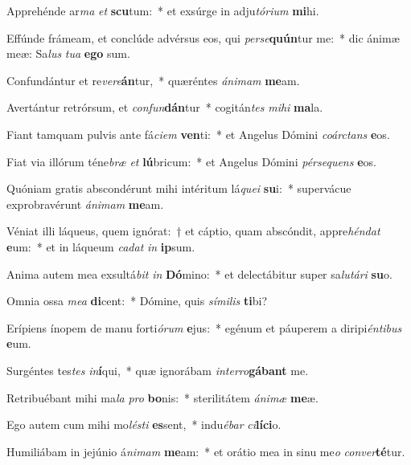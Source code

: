 \item Apprehénde ar\textit{ma} \textit{et} \textbf{scu}tum:~* et exsúrge in adju\textit{tó}\textit{ri}\textit{um} \textbf{mi}hi.
\item Effúnde frámeam, et conclúde advérsus eos, qui \textit{per}\textit{se}\textbf{quún}tur me:~* dic ánimæ meæ: Sa\textit{lus} \textit{tu}\textit{a} \textbf{e}\textbf{go} sum.
\item Confundántur et re\textit{ve}\textit{re}\textbf{án}tur,~* quæréntes \textit{á}\textit{ni}\textit{mam} \textbf{me}am.
\item Avertántur retrórsum, et \textit{con}\textit{fun}\textbf{dán}tur~* cogitán\textit{tes} \textit{mi}\textit{hi} \textbf{ma}la.
\item Fiant tamquam pulvis ante fá\textit{ci}\textit{em} \textbf{ven}ti:~* et Angelus Dómini \textit{co}\textit{árc}\textit{tans} \textbf{e}os.
\item Fiat via illórum téne\textit{bræ} \textit{et} \textbf{lú}bricum:~* et Angelus Dómini \textit{pér}\textit{se}\textit{quens} \textbf{e}os.
\item Quóniam gratis abscondérunt mihi intéritum lá\textit{que}\textit{i} \textbf{su}i:~* supervácue exprobravérunt \textit{á}\textit{ni}\textit{mam} \textbf{me}am.
\item Véniat illi láqueus, quem ignórat:~† et cáptio, quam abscóndit, appre\textit{hén}\textit{dat} \textbf{e}um:~* et in láqueum \textit{ca}\textit{dat} \textit{in} \textbf{ip}sum.
\item Anima autem mea exsultá\textit{bit} \textit{in} \textbf{Dó}mino:~* et delectábitur super sa\textit{lu}\textit{tá}\textit{ri} \textbf{su}o.
\item Omnia ossa \textit{me}\textit{a} \textbf{di}cent:~* Dómine, quis \textit{sí}\textit{mi}\textit{lis} \textbf{ti}bi?
\item Erípiens ínopem de manu forti\textit{ó}\textit{rum} \textbf{e}jus:~* egénum et páuperem a diripi\textit{én}\textit{ti}\textit{bus} \textbf{e}um.
\item Surgéntes tes\textit{tes} \textit{in}\textbf{í}qui,~* quæ ignorábam \textit{in}\textit{ter}\textit{ro}\textbf{gá}\textbf{bant} me.
\item Retribuébant mihi ma\textit{la} \textit{pro} \textbf{bo}nis:~* sterilitátem \textit{á}\textit{ni}\textit{mæ} \textbf{me}æ.
\item Ego autem cum mihi mo\textit{lés}\textit{ti} \textbf{es}sent,~* indu\textit{é}\textit{bar} \textit{ci}\textbf{lí}\textbf{ci}o.
\item Humiliábam in jejúnio á\textit{ni}\textit{mam} \textbf{me}am:~* et orátio mea in sinu me\textit{o} \textit{con}\textit{ver}\textbf{té}tur.

